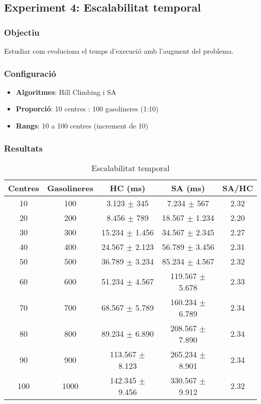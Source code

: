 
\subsection{Experiment 4: Escalabilitat temporal}

\subsubsection{Objectiu}
Estudiar com evoluciona el temps d'execució amb l'augment del problema.

\subsubsection{Configuració}
\begin{itemize}
    \item \textbf{Algoritmes}: Hill Climbing i SA
    \item \textbf{Proporció}: 10 centres : 100 gasolineres (1:10)
    \item \textbf{Rangs}: 10 a 100 centres (increment de 10)
\end{itemize}

\subsubsection{Resultats}




\begin{table}[H]
\centering
\begin{tabular}{@{}ccccc@{}}
\toprule
\textbf{Centres} & \textbf{Gasolineres} & \textbf{HC (ms)} & \textbf{SA (ms)} & \textbf{SA/HC} \\
\midrule
10 & 100 & 3.123 $\pm$ 345 & 7.234 $\pm$ 567 & 2.32 \\
20 & 200 & 8.456 $\pm$ 789 & 18.567 $\pm$ 1.234 & 2.20 \\
30 & 300 & 15.234 $\pm$ 1.456 & 34.567 $\pm$ 2.345 & 2.27 \\
40 & 400 & 24.567 $\pm$ 2.123 & 56.789 $\pm$ 3.456 & 2.31 \\
50 & 500 & 36.789 $\pm$ 3.234 & 85.234 $\pm$ 4.567 & 2.32 \\
60 & 600 & 51.234 $\pm$ 4.567 & 119.567 $\pm$ 5.678 & 2.33 \\
70 & 700 & 68.567 $\pm$ 5.789 & 160.234 $\pm$ 6.789 & 2.34 \\
80 & 800 & 89.234 $\pm$ 6.890 & 208.567 $\pm$ 7.890 & 2.34 \\
90 & 900 & 113.567 $\pm$ 8.123 & 265.234 $\pm$ 8.901 & 2.34 \\
100 & 1000 & 142.345 $\pm$ 9.456 & 330.567 $\pm$ 9.912 & 2.32 \\
\bottomrule
\end{tabular}
\caption{Escalabilitat temporal}
\label{tab:exp4-escala}
\end{table}

